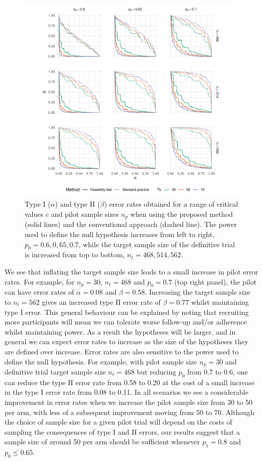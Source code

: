 \documentclass[AMA,STIX1COL]{WileyNJD-v2}
\begin{document}
\begin{figure}
\centering
\includegraphics[scale=0.8, trim={1.5cm 0 0 0},clip]{./Figures/eval.pdf}
\caption{Type I ($\alpha$) and type II ($\beta$) error rates obtained for a range of critical values $c$ and pilot sample sizes $n_p$ when using the proposed method (solid lines) and the conventional approach (dashed line). The power used to define the null hypothesis increases from left to right, $p_0 = 0.6, 0,65, 0.7$, while the target sample size of the definitive trial is increased from top to bottom, $n_t = 468, 514, 562$.}
\label{fig:eval}
\end{figure}
 
We see that inflating the target sample size leads to a small increase in pilot error rates. For example, for $n_p = 30$, $n_t = 468$ and $p_0 = 0.7$ (top right panel), the pilot can have error rates of $\alpha = 0.08$ and $\beta = 0.58$. Increasing the target sample size to $n_t = 562$ gives an increased type II error rate of $\beta = 0.77$ whilst maintaining type I error. This general behaviour can be explained by noting that recruiting more participants will mean we can tolerate worse follow-up and/or adherence whilst maintaining power. As a result the hypotheses will be larger, and in general we can expect error rates to increase as the size of the hypotheses they are defined over increase. Error rates are also sensitive to the power used to define the null hypothesis. For example, with pilot sample size $n_p = 30$ and definitive trial target sample size $n_t = 468$ but reducing $p_0$ from 0.7 to 0.6, one can reduce the type II error rate from 0.58 to 0.20 at the cost of a small increase in the type I error rate from 0.08 to 0.11. In all scenarios we see a considerable improvement in error rates when we increase the pilot sample size from 30 to 50 per arm, with less of a subsequent improvement moving from 50 to 70. Although the choice of sample size for a given pilot trial will depend on the costs of sampling the consequences of type I and II errors, our results suggest that a sample size of around 50 per arm should be sufficient whenever $p_1 = 0.8$ and $p_0 \leq 0.65$.
\end{document}
